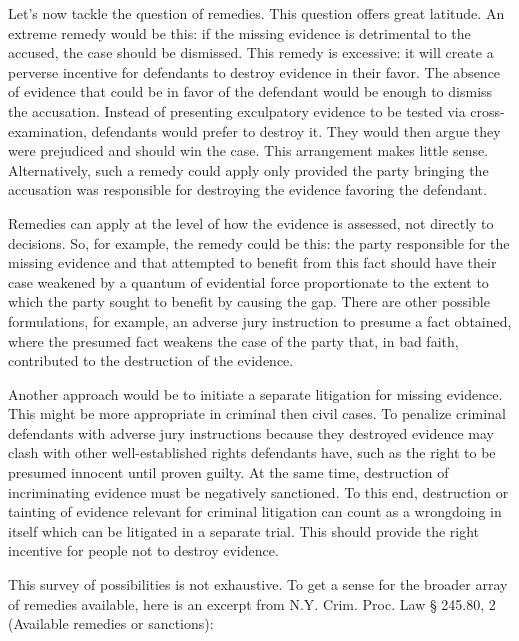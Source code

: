 \documentclass[
  10pt,
  dvipsnames,enabledeprecatedfontcommands]{scrartcl}
\begin{document}
Let's now tackle the question of remedies. This question offers great
latitude. An extreme remedy would be this: if the missing evidence is
detrimental to the accused, the case should be dismissed. This remedy is
excessive: it will create a perverse incentive for defendants to destroy
evidence in their favor. The absence of evidence that could be in favor
of the defendant would be enough to dismiss the accusation. Instead of
presenting exculpatory evidence to be tested via cross-examination,
defendants would prefer to destroy it. They would then argue they were
prejudiced and should win the case. This arrangement makes little sense.
Alternatively, such a remedy could apply only provided the party
bringing the accusation was responsible for destroying the evidence
favoring the defendant.

Remedies can apply at the level of how the evidence is assessed, not
directly to decisions. So, for example, the remedy could be this: the
party responsible for the missing evidence and that attempted to benefit
from this fact should have their case weakened by a quantum of
evidential force proportionate to the extent to which the party sought
to benefit by causing the gap. There are other possible formulations,
for example, an adverse jury instruction to presume a fact obtained,
where the presumed fact weakens the case of the party that, in bad
faith, contributed to the destruction of the evidence.

Another approach would be to initiate a separate litigation for missing
evidence. This might be more appropriate in criminal then civil cases.
To penalize criminal defendants with adverse jury instructions because
they destroyed evidence may clash with other well-established rights
defendants have, such as the right to be presumed innocent until proven
guilty. At the same time, destruction of incriminating evidence must be
negatively sanctioned. To this end, destruction or tainting of evidence
relevant for criminal litigation can count as a wrongdoing in itself
which can be litigated in a separate trial. This should provide the
right incentive for people not to destroy evidence.

This survey of possibilities is not exhaustive. To get a sense for the
broader array of remedies available, here is an excerpt from N.Y. Crim.
Proc. Law § 245.80, 2 (Available remedies or sanctions):
\end{document}
